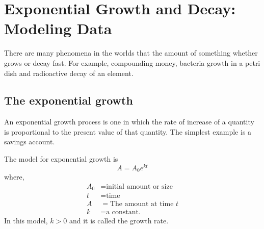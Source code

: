 \chapter{Exponential Growth and Decay: Modeling Data}
There are many phenomena in the worlds that the amount of something whether grows or decay fast. For example, compounding money, bacteria growth in a petri dish and radioactive decay of an element.
\section{The exponential growth}
An exponential growth process is one in which the rate of increase of a quantity is 
proportional to the present value of that quantity. The simplest example is a savings 
account.
	\begin{tcolorbox}[title=The exponential growth, fonttitle=\bfseries,
	                  colframe=blue!70!black,
	                  colback=white]
		The model for exponential growth is 
		\begin{equation}
				A=A_0e^{kt} \label{exp_growth}	
		\end{equation}
		where,
		\begin{align*}
			A_0&= \text{initial amount or size}\\
			t &=  \text{time} \\
			A &= \text{The amount at time $t$}\\
			k &= \text{a constant.}
		\end{align*}
		In this model, $k>0$ and it is called the growth rate.
	\end{tcolorbox}
